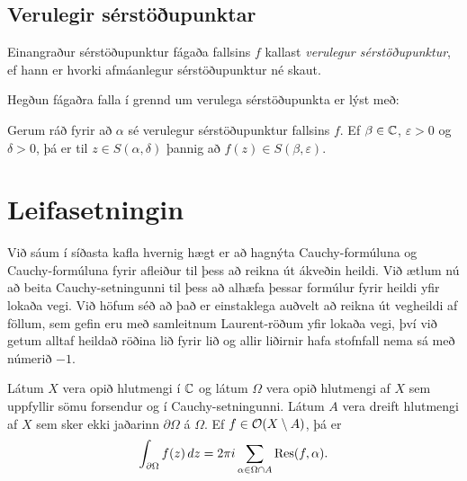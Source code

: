 \subsection*{Verulegir sérstöðupunktar}

\begin{sk}
Einangraður sérstöðupunktur fágaða fallsins $f$ kallast {\it
verulegur sérstöðupunktur}, 
ef hann er hvorki afmáanlegur sérstöðu\-punktur né skaut.  

\end{sk}

Hegðun fágaðra falla í grennd um verulega sérstöðupunkta er lýst með:

\begin{se}
Gerum ráð fyrir að $\alpha$ sé
verulegur sérstöðupunktur fallsins $f$.  Ef $\beta\in {\mathbb C}$,
$\varepsilon>0$ og $\delta>0$, þá er til $z\in S(\alpha,\delta)$
þannig að $f(z)\in S(\beta,\varepsilon)$.
\end{se}

\section{Leifasetningin }

\noindent
Við sáum í síðasta kafla hvernig hægt er að hagnýta
Cauchy-formúluna  og Cauchy-formúluna fyrir afleiður 
til þess að reikna út ákveðin heildi.  
Við ætlum nú að beita  Cauchy-setningunni til þess að 
alhæfa þessar formúlur fyrir heildi yfir lokaða vegi.
Við höfum séð að það er einstaklega auðvelt að
reikna út vegheildi  af föllum, sem gefin eru með samleitnum
Laurent-röðum yfir lokaða vegi, því við getum alltaf heildað röðina
lið fyrir lið og allir liðirnir hafa stofnfall nema sá með númerið
$-1$.  

\begin{se}  
Látum $X$ vera opið hlutmengi í ${\mathbb C}$ og látum $\Omega$ vera opið
hlutmengi af $X$ sem uppfyllir sömu forsendur og í
Cauchy-setningunni.
Látum $A$ vera dreift hlutmengi af $X$ sem sker ekki jaðarinn
$\partial\Omega$ á $\Omega$.  Ef $f\in {\cal O}(X\setminus A)$, þá er
 \begin{equation*}
\int_{\partial\Omega}f(z)\, dz = 2\pi i \sum_{\alpha\in \Omega\cap A}
{\operatorname{Res}}(f,\alpha).
\label{10.7.1}
 \end{equation*}
\end{se}

